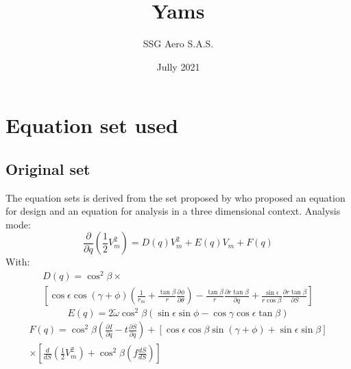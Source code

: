 \documentclass{report}
\begin{document}
    \title{Yams}
    \author{SSG Aero S.A.S.}
    \date{Jully 2021}
    \maketitle
    \chapter{Equation set used}
    \section{Original set}

        The equation sets is derived from the set proposed by \cite{Novak77} who proposed an equation for design and an equation for analysis in a three dimensional context.
        Analysis mode:
        \begin{equation}
            \frac{\partial}{\partial q} \left(\frac{1}{2}V_m^2\right) = 
            D\left(q\right) V_m^2 + E\left(q\right) V_m + F\left(q\right)
            \label{eq:analysis_general}
        \end{equation}
        With:
        \begin{equation}
            \begin{multlined}
                D\left(q\right) = \cos ^2 \beta \times \\ \left[
                    \cos \epsilon \cos\left(\gamma+\phi\right)\left(\frac{1}{r_m}+\frac{\tan \beta}{r}\frac{\partial \phi}{\partial \theta}\right)
                    -\frac{\tan \beta}{r}\frac{\partial r \tan \beta}{\partial q}
                    +\frac{\sin \epsilon}{r \cos \beta} \frac{\partial r \tan \beta}{\partial S}
                    \right]
            \end{multlined}
        \end{equation}
        \begin{equation}
            E \left(q\right) = 2 \widetilde{\omega} \cos^2 \beta \left(\sin \epsilon \sin \phi - \cos \gamma \cos \epsilon \tan \beta\right)
        \end{equation}
        \begin{equation}
            \begin{multlined}
                F \left(q\right) = \cos ^2 \beta \left(\frac{\partial I}{\partial q} - t \frac{\partial \overline{S} }{\partial q} \right)
                + \left[
                    \cos \epsilon \cos \beta \sin \left( \gamma + \phi \right) + \sin \epsilon \sin \beta 
                    \right] 
                \\ \times \left[
                    \frac{d}{dS} \left(\frac{1}{2}V_m^2\right)  + \cos^2 \beta \left(f \frac{d\overline{S}}{dS}\right)
                \right]
            \end{multlined}
        \end{equation}
\end{document}
